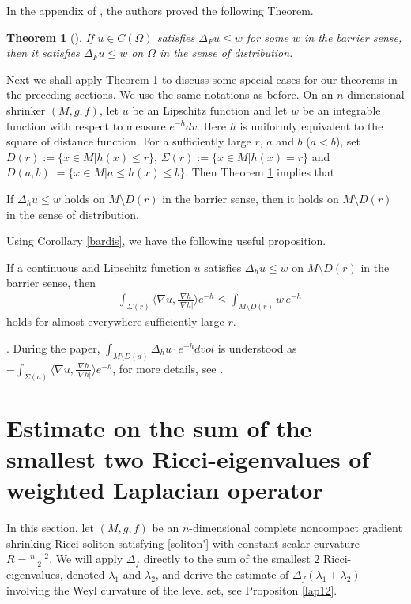 \documentclass[12pt]{amsart}
\newcommand{\Rk}{\noindent {\bf Remark} }
\newtheorem{theo}{Theorem}[section]
\begin{document}
In the appendix of \cite{Wu-Wu}, the authors proved the following Theorem.
\begin{theo}[\cite{Wu-Wu}]\label{bard}
If $u\in C(\Omega)$ satisfies $\Delta_F u\le w$ for some $w$
in the barrier sense, then it satisfies $\Delta_F u\le w$ on $\Omega$ in
the sense of distribution.
\end{theo}
Next we shall apply Theorem \ref{bard} to discuss some special cases for our
theorems in the preceding sections. We use the same notations as before. On
an $n$-dimensional shrinker $(M,g,f)$, let $u$ be an
 Lipschitz function and let $w$ be an integrable function
with respect to measure $e^{-h}dv$. Here $h$ is uniformly equivalent to the square of
distance function. For a sufficiently large
$r$, $a$ and $b$ ($a<b$), set $D(r):=\{x\in M|h(x)\le r\}$,
$\Sigma(r):=\{x\in M|h(x)=r\}$ and $D(a,b):=\{x\in M|a\le h(x)\le b\}$.
Then Theorem \ref{bard} implies that
\begin{coro}[\cite{Wu-Wu}]\label{bardis}
If $\Delta_h u\le w$ holds on $M\setminus D(r)$ in the barrier sense, then it
holds on $M\setminus D(r)$ in the sense of distribution.
\end{coro}
Using Corollary \ref{bardis}, we have the following useful proposition.
\begin{prop}[\cite{Wu-Wu}]\label{keyprop}
If a continuous and Lipschitz function $u$ satisfies $\Delta_h u\le w$
on $M\setminus D(r)$ in the barrier sense, then
\begin{align*}
-\int_{\Sigma(r)}\langle\nabla u, \tfrac{\nabla h}{|\nabla h|}\rangle e^{-h}\le \int_{M\setminus D(r)} w\, e^{-h}
\end{align*}
holds for almost everywhere sufficiently large $r$.
\end{prop}
\Rk. During the paper,  $\int_{M\setminus D(a)} \Delta_h u\cdot e^{-h}dvol$ is understood as $-\int_{\Sigma(a)}\langle \nabla u, \frac{\nabla h}{|\nabla h|}\rangle e^{-h}$, for more details, see \cite{Wu-Wu}.
	
	
	\section{Estimate on the sum of the smallest two Ricci-eigenvalues of weighted Laplacian operator}\label{sec3}
	In this section, let $(M, g, f)$ be an $n$-dimensional complete noncompact gradient shrinking Ricci soliton satisfying \eqref{soliton'} with constant scalar curvature $R=\frac{n-2}{2}$. We will apply $\Delta_f$ directly to the sum of the smallest $2$ Ricci-eigenvalues, denoted $\lambda_1$ and $\lambda_2$, and derive the estimate of $\Delta_f(\lambda_1+\lambda_2)$ involving the Weyl curvature of the level set, see Propositon \ref{lap12}.
	
\end{document}
